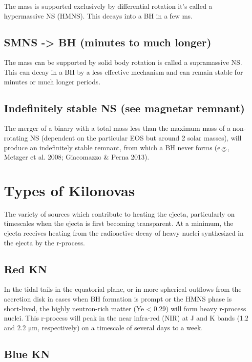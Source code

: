 The mass is supported exclusively by differential rotation it's called a hypermassive NS (HMNS).
This decays into a BH in a few ms.

\subsection{SMNS -> BH (minutes to much longer)}

The mass can be supported by solid body rotation is called a supramassive NS.
This can decay in a BH by a less effective mechanism and can remain stable for minutes or much longer periods.

\subsection{Indefinitely stable NS (see magnetar remnant)}

The merger of a binary with a total mass less than the maximum mass of a non-rotating NS (dependent on the particular EOS but around 2 solar masses), will produce an indefinitely stable remnant, from which a BH never forms (e.g., Metzger et al. 2008; Giacomazzo \& Perna 2013).

\section{Types of Kilonovas}

The variety of sources which contribute to heating the ejecta, particularly on timescales when the ejecta is first becoming transparent.
At a minimum, the ejecta receives heating from the radioactive decay of heavy nuclei synthesized in the ejecta by the r-process. 

\subsection{Red KN}

In the tidal tails in the equatorial plane, or in more spherical outflows from the accretion disk in cases when BH formation is prompt or the HMNS phase is short-lived, the highly neutron-rich matter (Ye < 0.29) will form heavy r-process nuclei.
This r-process will peak in the near infra-red (NIR) at J and K bands (1.2 and 2.2 μm, respectively) on a timescale of several days to a week.

\subsection{Blue KN}

